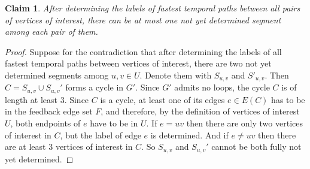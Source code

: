 \documentclass[11pt,a4paper]{article}
\newtheorem{claim}[theorem]{Claim}
\theoremstyle{remark}
\theoremstyle{definition}
\begin{document}
\begin{claim}
    After determining the labels of fastest temporal paths between all pairs of vertices of interest,
    there can be at most one not yet determined segment among each pair of them.
\end{claim}
\begin{proof}
   Suppose for the contradiction that after determining the labels of all fastest temporal paths between vertices of interest,
   there are two not yet determined segments among $u,v \in U$.
   Denote them with $S_{u,v}$ and $S'_{u,v}$. 
   Then $C = S_{u,v} \cup S_{u,v}'$ forms a cycle in $G'$. Since $G'$ admits no loops, the cycle $C$ is of length at least $3$.
   Since $C$ is a cycle, at least one of its edges $e \in E(C)$ has to be in the feedback edge set $F$, and therefore, by the definition of vertices of interest $U$, 
   both endpoints of $e$ have to be in $U$.
   If $e = uv$ then there are only two vertices of interest in $C$, but the label of edge $e$ is determined.
   And if $e \neq uv$ then there are at least $3$ vertices of interest in $C$.
   So $S_{u,v}$ and $S_{u,v}'$ cannot be both fully not yet determined.
\end{proof}
\end{document}
